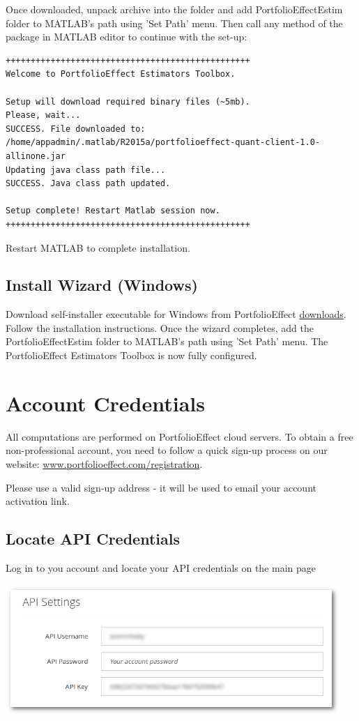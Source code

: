 \documentclass[letterpaper]{report}
\begin{document}
Once downloaded, unpack archive into the folder and add
PortfolioEffectEstim folder to MATLAB's path using 'Set Path' menu. Then call
any method of the package in MATLAB editor to continue with the set-up:
\begin{lstlisting}
+++++++++++++++++++++++++++++++++++++++++++++++++
Welcome to PortfolioEffect Estimators Toolbox.
 
Setup will download required binary files (~5mb).
Please, wait...
SUCCESS. File downloaded to: 
/home/appadmin/.matlab/R2015a/portfolioeffect-quant-client-1.0-allinone.jar
Updating java class path file...
SUCCESS. Java class path updated.

Setup complete! Restart Matlab session now.
+++++++++++++++++++++++++++++++++++++++++++++++++
\end{lstlisting}

Restart MATLAB to complete installation.

\section{Install Wizard (Windows)}
Download self-installer executable for Windows from PortfolioEffect
\href{https://www.portfolioeffect.com/docs/platform/quant/tools/matlab}{downloads}.
Follow the installation instructions. Once the wizard completes, add the
PortfolioEffectEstim folder to MATLAB's path using 'Set Path' menu. 
The PortfolioEffect Estimators Toolbox is now fully configured.
 
\chapter{Account Credentials}
All computations are performed on PortfolioEffect cloud servers.
To obtain a free non-professional account, you need to follow a quick sign-up
process on our website:
\href{https://www.portfolioeffect.com/registration}{www.portfolioeffect.com/registration}.\par
Please use a valid sign-up address - it will be used to email your
account activation link.

\section{Locate API Credentials} 
Log in to you account and locate your API credentials on the main page

\includegraphics[width=5in,natwidth=768,natheight=300]{img/api-settings.png}
 
\end{document}
